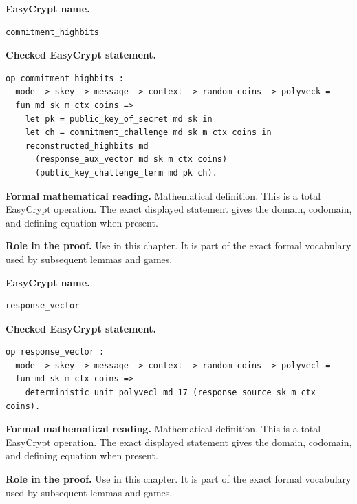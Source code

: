 \begin{formaldefinition}
\noindent\textbf{EasyCrypt name.}
\begin{lstlisting}[language=EasyCrypt,basicstyle=\ttfamily\scriptsize]
commitment_highbits
\end{lstlisting}
\noindent\textbf{Checked EasyCrypt statement.}
\begin{lstlisting}[language=EasyCrypt,basicstyle=\ttfamily\scriptsize]
op commitment_highbits :
  mode -> skey -> message -> context -> random_coins -> polyveck =
  fun md sk m ctx coins =>
    let pk = public_key_of_secret md sk in
    let ch = commitment_challenge md sk m ctx coins in
    reconstructed_highbits md
      (response_aux_vector md sk m ctx coins)
      (public_key_challenge_term md pk ch).
\end{lstlisting}
\noindent\textbf{Formal mathematical reading.}
Mathematical definition. This is a total EasyCrypt operation.  The exact displayed statement gives the domain, codomain, and defining equation when present.

\noindent\textbf{Role in the proof.}
Use in this chapter. It is part of the exact formal vocabulary used by subsequent lemmas and games.

\end{formaldefinition}

\begin{formaldefinition}
\noindent\textbf{EasyCrypt name.}
\begin{lstlisting}[language=EasyCrypt,basicstyle=\ttfamily\scriptsize]
response_vector
\end{lstlisting}
\noindent\textbf{Checked EasyCrypt statement.}
\begin{lstlisting}[language=EasyCrypt,basicstyle=\ttfamily\scriptsize]
op response_vector :
  mode -> skey -> message -> context -> random_coins -> polyvecl =
  fun md sk m ctx coins =>
    deterministic_unit_polyvecl md 17 (response_source sk m ctx coins).
\end{lstlisting}
\noindent\textbf{Formal mathematical reading.}
Mathematical definition. This is a total EasyCrypt operation.  The exact displayed statement gives the domain, codomain, and defining equation when present.

\noindent\textbf{Role in the proof.}
Use in this chapter. It is part of the exact formal vocabulary used by subsequent lemmas and games.

\end{formaldefinition}

